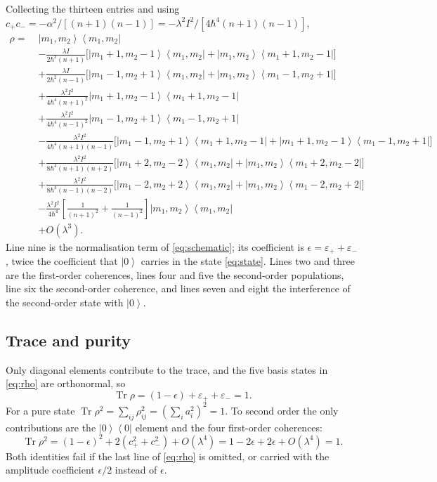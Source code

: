 \documentclass[preprint,12pt]{elsarticle}
\newcommand{\Tr}{\operatorname{Tr}}
\newcommand{\ket}[1]{\left|#1\right\rangle}
\newcommand{\ketbra}[2]{\left|#1\right\rangle\!\left\langle#2\right|}
\newcommand{\epsp}{\varepsilon_{+}}
\newcommand{\epsm}{\varepsilon_{-}}
\begin{document}
Collecting the thirteen entries and using
$c_{+}c_{-}=-\alpha^{2}/[(n+1)(n-1)]=-\lambda^{2}I^{2}/[4\hbar^{4}(n+1)(n-1)]$,
\begingroup\small
\begin{align}
\rho=\;&\ketbra{m_{1},m_{2}}{m_{1},m_{2}}\nonumber\\[2pt]
&-\frac{\lambda I}{2\hbar^{2}(n+1)}
\Big[\ketbra{m_{1}+1,m_{2}-1}{m_{1},m_{2}}
+\ketbra{m_{1},m_{2}}{m_{1}+1,m_{2}-1}\Big]\nonumber\\[2pt]
&+\frac{\lambda I}{2\hbar^{2}(n-1)}
\Big[\ketbra{m_{1}-1,m_{2}+1}{m_{1},m_{2}}
+\ketbra{m_{1},m_{2}}{m_{1}-1,m_{2}+1}\Big]\nonumber\\[2pt]
&+\frac{\lambda^{2}I^{2}}{4\hbar^{4}(n+1)^{2}}
\ketbra{m_{1}+1,m_{2}-1}{m_{1}+1,m_{2}-1}\nonumber\\[2pt]
&+\frac{\lambda^{2}I^{2}}{4\hbar^{4}(n-1)^{2}}
\ketbra{m_{1}-1,m_{2}+1}{m_{1}-1,m_{2}+1}\nonumber\\[2pt]
&-\frac{\lambda^{2}I^{2}}{4\hbar^{4}(n+1)(n-1)}
\Big[\ketbra{m_{1}-1,m_{2}+1}{m_{1}+1,m_{2}-1}
+\ketbra{m_{1}+1,m_{2}-1}{m_{1}-1,m_{2}+1}\Big]\nonumber\\[2pt]
&+\frac{\lambda^{2}I^{2}}{8\hbar^{4}(n+1)(n+2)}
\Big[\ketbra{m_{1}+2,m_{2}-2}{m_{1},m_{2}}
+\ketbra{m_{1},m_{2}}{m_{1}+2,m_{2}-2}\Big]\nonumber\\[2pt]
&+\frac{\lambda^{2}I^{2}}{8\hbar^{4}(n-1)(n-2)}
\Big[\ketbra{m_{1}-2,m_{2}+2}{m_{1},m_{2}}
+\ketbra{m_{1},m_{2}}{m_{1}-2,m_{2}+2}\Big]\nonumber\\[2pt]
&-\frac{\lambda^{2}I^{2}}{4\hbar^{4}}
\left[\frac{1}{(n+1)^{2}}+\frac{1}{(n-1)^{2}}\right]
\ketbra{m_{1},m_{2}}{m_{1},m_{2}}\nonumber\\[2pt]
&+O(\lambda^{3}).
\label{eq:rho}
\end{align}
\endgroup
Line nine is the normalisation term of \eqref{eq:schematic}; its
coefficient is $\epsilon=\epsp+\epsm$, twice the coefficient that $\ket0$
carries in the state \eqref{eq:state}. Lines two and three are the first-order
coherences, lines four and five the second-order populations, line six the
second-order coherence, and lines seven and eight the interference of the
second-order state with $\ket0$.

\subsection{Trace and purity}

Only diagonal elements contribute to the trace, and the five basis states in
\eqref{eq:rho} are orthonormal, so
\begin{equation}
\Tr\rho=\left(1-\epsilon\right)+\epsp+\epsm=1 .
\end{equation}
For a pure state $\Tr\rho^{2}=\sum_{ij}\rho_{ij}^{2}=\left(\sum_{i}a_{i}^{2}
\right)^{2}=1$. To second order the only contributions are the
$\ketbra00$ element and the four first-order coherences:
\begin{equation}
\Tr\rho^{2}=\left(1-\epsilon\right)^{2}+2\left(c_{+}^{2}+c_{-}^{2}\right)
+O(\lambda^{4})=1-2\epsilon+2\epsilon+O(\lambda^{4})=1 .
\end{equation}
Both identities fail if the last line of \eqref{eq:rho} is omitted, or carried
with the amplitude coefficient $\epsilon/2$ instead of $\epsilon$.
\end{document}

